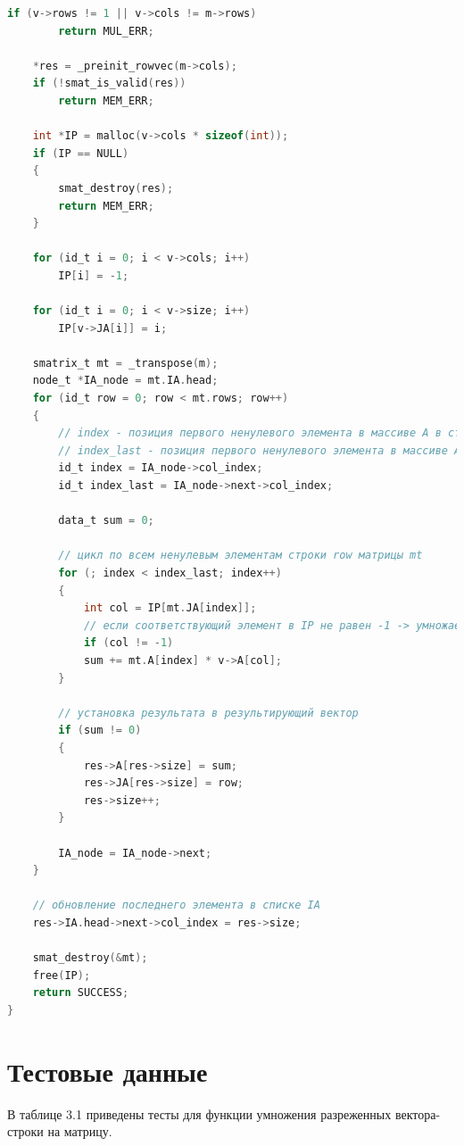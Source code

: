 \begin{lstlisting}[label=mult,language=C,caption=Реализация умножения матриц]
	if (v->rows != 1 || v->cols != m->rows)
		return MUL_ERR;
	
	*res = _preinit_rowvec(m->cols);
	if (!smat_is_valid(res))
		return MEM_ERR;
	
	int *IP = malloc(v->cols * sizeof(int));
	if (IP == NULL)
	{
		smat_destroy(res);
		return MEM_ERR;
	}
	
	for (id_t i = 0; i < v->cols; i++)
		IP[i] = -1;
	
	for (id_t i = 0; i < v->size; i++)
		IP[v->JA[i]] = i;
	
	smatrix_t mt = _transpose(m);
	node_t *IA_node = mt.IA.head;
	for (id_t row = 0; row < mt.rows; row++)
	{
		// index - позиция первого ненулевого элемента в массиве A в строке row матрицы mt
		// index_last - позиция первого ненулевого элемента в массиве А в следующей строке за row
		id_t index = IA_node->col_index;
		id_t index_last = IA_node->next->col_index;
		
		data_t sum = 0;
		
		// цикл по всем ненулевым элементам строки row матрицы mt
		for (; index < index_last; index++)
		{
			int col = IP[mt.JA[index]];
			// если соответствующий элемент в IP не равен -1 -> умножаем
			if (col != -1)
			sum += mt.A[index] * v->A[col];
		}
		
		// установка результата в результирующий вектор
		if (sum != 0)
		{
			res->A[res->size] = sum;
			res->JA[res->size] = row;
			res->size++;
		}
		
		IA_node = IA_node->next;
	}
	
	// обновление последнего элемента в списке IA
	res->IA.head->next->col_index = res->size;
	
	smat_destroy(&mt);
	free(IP);
	return SUCCESS;
}

\end{lstlisting}

\pagebreak

\section{Тестовые данные}

В таблице 3.1 приведены тесты для функции умножения разреженных вектора-строки на матрицу.

